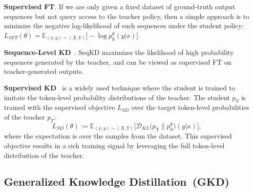 \documentclass{article} %
\newcommand{\E}{\mathbb{E}}
\newcommand{\KL}{D_{\mathrm{KL}}}
\def\KL{\mathcal{D}_{KL}}
\newcommand{\stu}[0]{p_{\text{S}}}
\newcommand{\tea}[0]{p_{\text{T}}}
\begin{document}
\textbf{Supervised FT}. If we are only given a fixed dataset of ground-truth output sequences but not query access to the teacher policy, then a simple approach is to minimize the negative log-likelihood of such sequences under the student policy:  $L_{SFT}(\theta) = \E_{(x, y) \sim (X, Y)} \big[-\log\stu^\theta(y|x)\big]$. 


\textbf{Sequence-Level KD}~\citep{kim2016sequence}. SeqKD maximizes the likelihood of high probability sequences generated by the teacher, and can be viewed as supervised FT on teacher-generated outputs. 


\textbf{Supervised KD}~\citep{hinton2015distilling, sanh2019distilbert} is a widely used technique where the student is trained to imitate the token-level probability distributions of the teacher. The student $p_S$ is trained with the supervised objective $L_{SD}$ over the target token-level probabilities of the teacher $p_T$: 
\begin{equation}
L_{SD}(\theta) := %
\E_{(x, y) \sim (X, Y)} \Big[ \KL\big(\tea \| \stu^\theta\big)(y|x)\Big],
\label{eq:sd}
\end{equation}
where the expectation is over the samples from the dataset. This supervised objective results in a rich training signal by leveraging the full token-level distribution of the teacher. %



\subsection{Generalized Knowledge Distillation~(GKD)}
\end{document}

